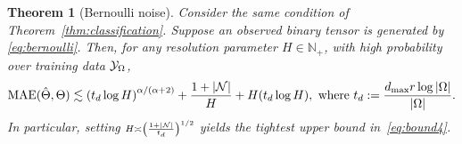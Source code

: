 \documentclass[twoside,11pt]{article}
\theoremstyle{plain}
\newtheorem{thm}{Theorem}
\theoremstyle{definition}
\begin{document}
\begin{thm}[Bernoulli noise]\label{thm:bernoulli}
Consider the same condition of Theorem~\ref{thm:classification}. Suppose an observed binary tensor is generated by \eqref{eq:bernoulli}. Then, for any resolution parameter $H\in\mathbb{N}_{+}$, with high probability over training data $\mathcal{Y}_\Omega$,
\begin{equation}\label{eq:bound4}
\textup{MAE}(\hat \Theta, \Theta)\lesssim \left(t_d\log H\right)^{\alpha/(\alpha+2)}+{1+|\mathcal{N}|\over H}+{H( t_d\log H)},\text{ where } t_d :={ d_{\max}r\log |\Omega|\over |\Omega|}.
\end{equation}
In particular, setting $\scriptstyle H\asymp \left({1+|\mathcal{N}|\over t_d} \right)^{1/2}$ yields the tightest upper bound in~\eqref{eq:bound4}.
\end{thm}
\end{document}
